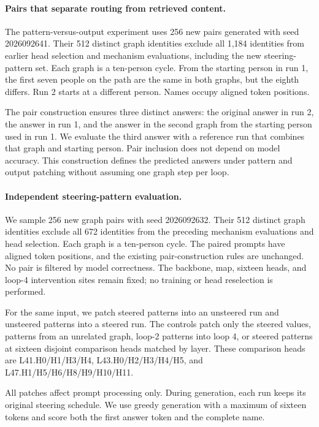 \documentclass{article}
\begin{document}
\paragraph{Pairs that separate routing from retrieved content.}
The pattern-versus-output experiment uses 256 new pairs generated with seed 2026092641. Their 512 distinct graph identities exclude all 1,184 identities from earlier head selection and mechanism evaluations, including the new steering-pattern set. Each graph is a ten-person cycle. From the starting person in run 1, the first seven people on the path are the same in both graphs, but the eighth differs. Run 2 starts at a different person. Names occupy aligned token positions.

The pair construction ensures three distinct answers: the original answer in run 2, the answer in run 1, and the answer in the second graph from the starting person used in run 1. We evaluate the third answer with a reference run that combines that graph and starting person. Pair inclusion does not depend on model accuracy. This construction defines the predicted answers under pattern and output patching without assuming one graph step per loop.

\paragraph{Independent steering-pattern evaluation.}
We sample 256 new graph pairs with seed 2026092632. Their 512 distinct graph identities exclude all 672 identities from the preceding mechanism evaluations and head selection. Each graph is a ten-person cycle. The paired prompts have aligned token positions, and the existing pair-construction rules are unchanged. No pair is filtered by model correctness. The backbone, map, sixteen heads, and loop-4 intervention sites remain fixed; no training or head reselection is performed.

For the same input, we patch steered patterns into an unsteered run and unsteered patterns into a steered run. The controls patch only the steered values, patterns from an unrelated graph, loop-2 patterns into loop 4, or steered patterns at sixteen disjoint comparison heads matched by layer. These comparison heads are L41.H0/H1/H3/H4, L43.H0/H2/H3/H4/H5, and L47.H1/H5/H6/H8/H9/H10/H11.

All patches affect prompt processing only. During generation, each run keeps its original steering schedule. We use greedy generation with a maximum of sixteen tokens and score both the first answer token and the complete name.
\end{document}
